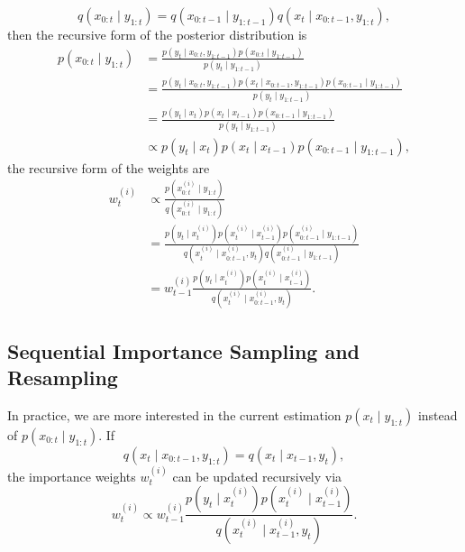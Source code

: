 \begin{equation}
q(x_{0:t}\mid y_{1:t}) = q(x_{0:t-1}\mid y_{1:t-1}) q(x_t \mid  x_{0:t-1},y_{1:t}),
\end{equation}
then the recursive form of the posterior distribution is 
\begin{equation}
\begin{split}
p(x_{0:t}\mid y_{1:t}) &= \frac{p(y_t \mid x_{0:t},y_{1:t-1})p(x_{0:t}\mid y_{1:t-1})}{p(y_t \mid y_{1:t-1})}\\
&= \frac{p(y_t \mid x_{0:t},y_{1:t-1}) p(x_t \mid x_{0:t-1},y_{1:t-1}) p(x_{0:t-1}\mid y_{1:t-1} ) }{p(y_t \mid y_{1:t-1})}\\
&= \frac{p(y_t \mid x_t ) p(x_t \mid x_{t-1}) p(x_{0:t-1}\mid y_{1:t-1} ) }{p(y_t \mid y_{1:t-1})}\\
&\propto p(y_t \mid x_t ) p(x_t \mid x_{t-1}) p(x_{0:t-1}\mid y_{1:t-1} ),
\end{split}
\end{equation}
the recursive form of the weights are
\begin{equation}
\begin{split}
w_t^{(i)} &\propto \frac{p\left(x_{0:t}^{(i)}\mid y_{1:t}\right)}{q\left(x_{0:t}^{(i)}\mid y_{1:t}\right)}\\
&= \frac{ p\left(y_{t}\mid x_{t}^{(i)}\right) p\left(x_{t}^{(i)}\mid x_{t-1}^{(i)}\right)  p\left(x_{0:t-1}^{(i)}\mid y_{1:t-1}\right)}   { q\left(x_{t}^{(i)}\mid x_{0:t-1}^{(i)},y_{t}\right)  q\left(x_{0:t-1}^{(i)}\mid y_{1:t-1}\right) } \\
&= w_{t-1}^{(i)} \frac{ p\left(y_{t}\mid x_{t}^{(i)}\right) p\left(x_{t}^{(i)}\mid x_{t-1}^{(i)}\right) }   {q\left(x_{t}^{(i)}\mid x_{0:t-1}^{(i)},y_{t}\right)}.
\end{split}
\end{equation}


\subsection{Sequential Importance Sampling and Resampling}
 
In practice, we are more interested in the current estimation $p(x_t \mid y_{1:t})$ instead of $p(x_{0:t}\mid y_{1:t})$. If  
\begin{equation}
q(x_t \mid  x_{0:t-1},y_{1:t})=q(x_t \mid  x_{t-1},y_t ),
\end{equation}
the importance weights $w_t^{(i)}$ can be updated recursively via 
\begin{equation}
w_t^{(i)}\propto w_{t-1}^{(i)} \frac{ p\left(y_t \mid x_t^{(i)}\right) p\left(x_{t}^{(i)}\mid x_{t-1}^{(i)}\right) }{q\left(x_{t}^{(i)}\mid x_{t-1}^{(i)},y_{t}\right)}.
\end{equation}

